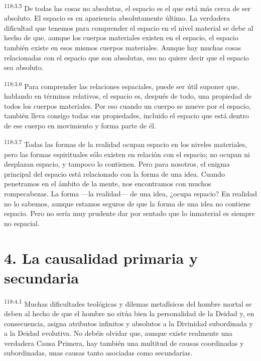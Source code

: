 \documentclass[twoside, 11pt]{book}
\begin{document}
\par
\textsuperscript{118:3.5} De todas las cosas no absolutas, el espacio es el que está más cerca de ser absoluto. El espacio es en apariencia absolutamente último. La verdadera dificultad que tenemos para comprender el espacio en el nivel material se debe al hecho de que, aunque los cuerpos materiales existen en el espacio, el espacio también existe en esos mismos cuerpos materiales. Aunque hay muchas cosas relacionadas con el espacio que son absolutas, eso no quiere decir que el espacio sea absoluto.

\par
\textsuperscript{118:3.6} Para comprender las relaciones espaciales, puede ser útil suponer que, hablando en términos relativos, el espacio es, después de todo, una propiedad de todos los cuerpos materiales. Por eso cuando un cuerpo se mueve por el espacio, también lleva consigo todas sus propiedades, incluido el espacio que está dentro de ese cuerpo en movimiento y forma parte de él.

\par
\textsuperscript{118:3.7} Todas las formas de la realidad ocupan espacio en los niveles materiales, pero las formas espirituales sólo existen en relación con el espacio; no ocupan ni desplazan espacio, y tampoco lo contienen. Pero para nosotros, el enigma principal del espacio está relacionado con la forma de una idea. Cuando penetramos en el ámbito de la mente, nos encontramos con muchos rompecabezas. La forma ---la realidad--- de una idea, ¿ocupa espacio? En realidad no lo sabemos, aunque estamos seguros de que la forma de una idea no contiene espacio. Pero no sería muy prudente dar por sentado que lo inmaterial es siempre no espacial.

\section*{4. La causalidad primaria y secundaria}
\par
\textsuperscript{118:4.1} Muchas dificultades teológicas y dilemas metafísicos del hombre mortal se deben al hecho de que el hombre no sitúa bien la personalidad de la Deidad y, en consecuencia, asigna atributos infinitos y absolutos a la Divinidad subordinada y a la Deidad evolutiva. No debéis olvidar que, aunque existe realmente una verdadera Causa Primera, hay también una multitud de causas coordinadas y subordinadas, unas causas tanto asociadas como secundarias.
\end{document}

